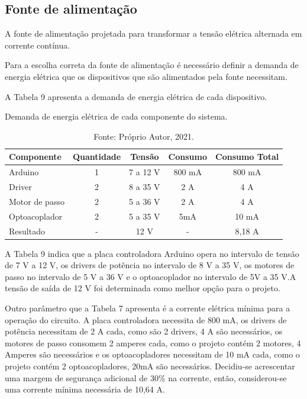 \subsection{Fonte de alimentação}

A fonte de alimentação projetada para transformar a tensão elétrica alternada em corrente contínua.

Para a escolha correta da fonte de alimentação é necessário definir a demanda de energia elétrica 
que os dispositivos que são alimentados pela fonte necessitam.

A Tabela 9 apresenta a demanda de energia elétrica de cada dispositivo.

\begin{table}
    \centering
    \caption{Demanda de energia elétrica de cada componente do sistema.}
    \begin{tabular}{lcccc}
        \hline
        \textbf{Componente} & \textbf{Quantidade} & \textbf{Tensão} & \textbf{Consumo} & \textbf{Consumo Total}\\
        \hline
        Arduino & 1 & 7 a 12 V & 800 mA & 800 mA\\
        Driver & 2 & 8 a 35 V & 2 A & 4 A\\
        Motor de passo & 2 & 5 a 36 V & 2 A & 4 A\\
        Optoacoplador & 2 & 5 a 35 V & 5mA & 10 mA\\
        Resultado & - & 12 V & - & 8,18 A\\
        \hline       
    \end{tabular}
    \caption*{Fonte: Próprio Autor, 2021.}
    \label{tab:demandafonte}
\end{table}

A Tabela 9 indica que a placa controladora Arduino opera no intervalo de tensão de 7 V a 12 V, 
os drivers de potência no intervalo de 8 V a 35 V, os motores de passo no intervalo de 5 V a 36 V 
e o optoacoplador no intervalo de 5V a 35 V.A tensão de saída de 12 V foi determinada como melhor 
opção para o projeto.

Outro parâmetro que a Tabela 7 apresenta é a corrente elétrica mínima para a operação do circuito. 
A placa controladora necessita de 800 mA, os drivers de potência necessitam de 2 A cada, como são 2 drivers, 
4 A são necessários, os motores de passo consomem 2 amperes cada, como o projeto contém 2 motores, 4 Amperes 
são necessários e os optoacopladores necessitam de 10 mA cada, como o projeto contém 2 optoacopladores, 
20mA são necessários. Decidiu-se acrescentar uma margem de segurança adicional de 30\% na corrente, 
então, considerou-se uma corrente mínima necessária de 10,64 A.

